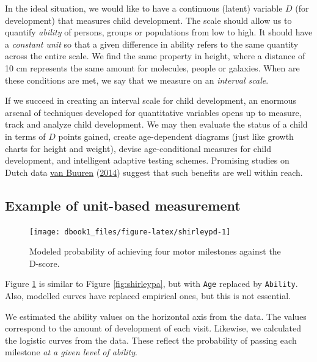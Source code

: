 \documentclass[
]{book}
\begin{document}
In the ideal situation, we would like to have a continuous (latent) variable \(D\) (for development) that measures child development. The scale should allow us to quantify \emph{ability} of persons, groups or populations from low to high. It should have a \emph{constant unit} so that a given difference in ability refers to the same quantity across the entire scale. We find the same property in height, where a distance of 10 cm represents the same amount for molecules, people or galaxies. When are these conditions are met, we say that we measure on an \emph{interval scale}.

If we succeed in creating an interval scale for child development, an enormous arsenal of techniques developed for quantitative variables opens up to measure, track and analyze child development. We may then evaluate the status of a child in terms of \(D\) points gained, create age-dependent diagrams (just like growth charts for height and weight), devise age-conditional measures for child development, and intelligent adaptive testing schemes. Promising studies on Dutch data \protect\hyperlink{ref-vanbuuren2014}{van Buuren} (\protect\hyperlink{ref-vanbuuren2014}{2014}) suggest that such benefits are well within reach.

\hypertarget{sec:unitbasedexample}{%
\subsection{Example of unit-based measurement}\label{sec:unitbasedexample}}

\begin{figure}

{\centering \texttt{[image: dbook1\_files/figure-latex/shirleypd-1]} 

}

\caption{Modeled probability of achieving four motor milestones against the D-score.}\label{fig:shirleypd}
\end{figure}



Figure \ref{fig:shirleypd} is similar to Figure \ref{fig:shirleypa}, but with \texttt{Age} replaced by \texttt{Ability}. Also, modelled curves have replaced empirical ones, but this is not essential.

We estimated the ability values on the horizontal axis from the data. The values correspond to the amount of development of each visit. Likewise, we calculated the logistic curves from the data. These reflect the probability of passing each milestone \emph{at a given level of ability}.
\end{document}
